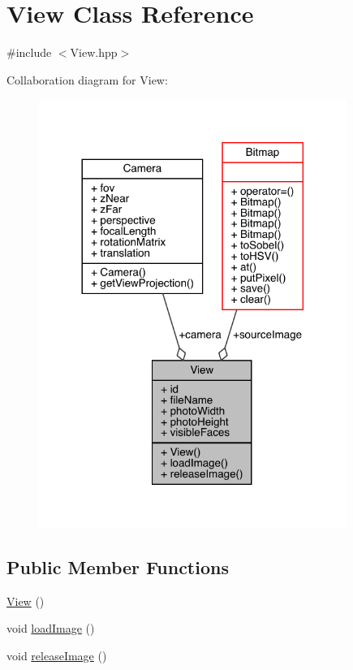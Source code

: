 \hypertarget{class_view}{}\section{View Class Reference}
\label{class_view}


{\ttfamily \#include $<$View.\+hpp$>$}



Collaboration diagram for View\+:\nopagebreak
\begin{figure}[H]
\begin{center}
\leavevmode
\includegraphics[width=284pt]{class_view__coll__graph}
\end{center}
\end{figure}
\subsection*{Public Member Functions}
\begin{DoxyCompactItemize}
\item 
\hyperlink{class_view_a44ad60a768422d3fa8fbd7576950080a}{View} ()
\item 
void \hyperlink{class_view_a58942806f815fc1f34034c1464aa3d57}{load\+Image} ()
\item 
void \hyperlink{class_view_aa280b349b020b2fb14863b66d054a1da}{release\+Image} ()
\end{DoxyCompactItemize}
